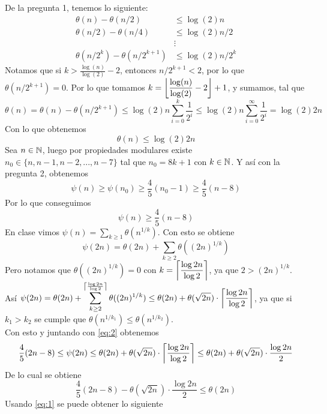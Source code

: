 \begin{sol}
	De la pregunta 1, tenemos lo siguiente:
	\begin{align*}
		\theta(n)-\theta(n/2)           & \leq\log(2)n     \\
		\theta(n/2)-\theta(n/4)         & \leq\log(2)n/2   \\
		                                & \vdots           \\
		\theta(n/2^k)-\theta(n/2^{k+1}) & \leq\log(2)n/2^k
	\end{align*}
	Notamos que si $k>\frac{\log(n)}{\log(2)}-2$, entonces $n/2^{k+1}<2$, por lo que $\theta(n/2^{k+1})=0$. Por lo que tomamos $k=\left\lfloor\dfrac{\log(n)}{\log(2)}-2\right\rfloor+1$, y sumamos, tal que
	\[\theta(n)=\theta(n)-\theta(n/2^{k+1})\leq\log(2)n\sum_{i=0}^k\frac{1}{2^i}\leq\log(2)n\sum_{i=0}^\infty\frac{1}{2^i}=\log(2)2n\]
	Con lo que obtenemos
	\begin{equation}
		\theta(n)\leq\log(2)2n\label{eq:1}
	\end{equation}
	Sea $n\in\mathbb{N}$, luego por propiedades modulares existe $n_0\in\{n,n-1,n-2,...,n-7\}$ tal que $n_0=8k+1$ con $k\in\mathbb{N}$. Y así con la pregunta 2, obtenemos
	\[\psi(n)\geq\psi(n_0)\geq\frac{4}{5}(n_0-1)\geq\frac{4}{5}(n-8)\]
	Por lo que conseguimos
	\begin{equation}
		\psi(n)\geq\frac{4}{5}(n-8)\label{eq:2}
	\end{equation}
	En clase vimos $\psi(n)=\sum_{k\geq1}\theta(n^{1/k})$. Con esto se obtiene
	\[\psi(2n)=\theta(2n)+\sum_{k\geq2}\theta((2n)^{1/k})\]
	Pero notamos que $\theta((2n)^{1/k})=0$ con $k=\left\lceil\dfrac{\log2n}{\log2}\right\rceil$, ya que $2>(2n)^{1/k}$.\\
	Así $\displaystyle\psi(2n)=\theta(2n)+\sum_{k\geq2}^{\left\lceil\frac{\log2n}{\log2}\right\rceil}\theta((2n)^{1/k})\leq\theta(2n)+\theta(\sqrt{2n})\cdot\left\lceil\dfrac{\log2n}{\log2}\right\rceil$, ya que si $k_1>k_2$ se cumple que $\theta(n^{1/k_1})\leq\theta(n^{1/k_2})$.\\
	Con esto y juntando con \eqref{eq:2} obtenemos
	\begin{equation*}
		\frac{4}{5}(2n-8)\leq\psi(2n)\leq\theta(2n)+\theta(\sqrt{2n})\cdot\left\lceil\frac{\log2n}{\log2}\right\rceil\leq\theta(2n)+\theta(\sqrt{2n})\cdot\frac{\log2n}{2}
	\end{equation*}
	De lo cual se obtiene
	\begin{equation}
		\frac45(2n-8)-\theta(\sqrt{2n})\cdot\frac{\log2n}{2}\leq\theta(2n)\label{eq:3}
	\end{equation}
	Usando \eqref{eq:1} se puede obtener lo siguiente
	\begin{align}

\end{align}
\end{sol}

